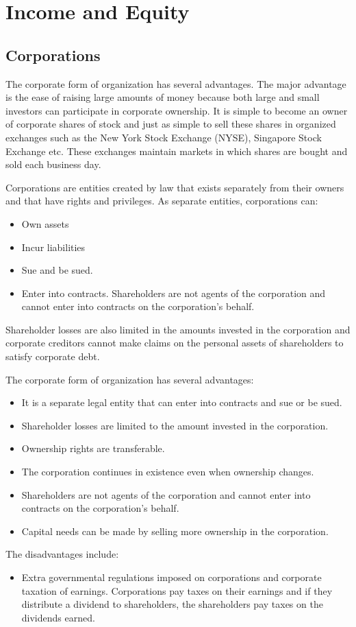 \documentclass[../main.tex]{subfiles}
\begin{document}
	\section{Income and Equity}
	
	\subsection{Corporations}
	
	The corporate form of organization has several advantages. The major 
	advantage is the ease of raising large amounts of money because both large 
	and small investors can participate in corporate ownership. It is simple to 
	become an owner of corporate shares of stock and just as simple to sell 
	these shares in organized exchanges such as the New York Stock Exchange 
	(NYSE), Singapore Stock Exchange etc. These exchanges maintain markets in 
	which shares are bought and sold each business day. 
	
	Corporations are entities created by law that exists separately from their 
	owners and that have rights and privileges. As separate entities, 
	corporations can:
	\begin{itemize}[noitemsep]
		\item Own assets
		\item Incur liabilities
		\item Sue and be sued.
		\item Enter into contracts. Shareholders are not agents of the 
		corporation and cannot enter into contracts on the corporation's 
		behalf. 
	\end{itemize}
	Shareholder losses are also limited in the amounts invested in the 
	corporation and corporate creditors cannot make claims on the personal 
	assets of shareholders to satisfy corporate debt.
	
	The corporate  form of organization has several advantages:
	\begin{itemize}[noitemsep]
		\item It is a separate legal entity that can enter into contracts and 
		sue or be sued. 
		\item Shareholder losses are limited to the amount invested in the 
		corporation.
		\item Ownership rights are transferable. 
		\item The corporation continues in existence even when ownership 
		changes. 
		\item Shareholders are not agents of the corporation and cannot enter 
		into contracts on the corporation's behalf. 
		\item Capital needs can be made by selling more ownership in the 
		corporation. 
	\end{itemize}
	The disadvantages include:
	\begin{itemize}[noitemsep]
		\item Extra governmental regulations imposed on corporations and 
		corporate taxation of earnings. Corporations pay taxes on their 
		earnings and if they distribute a dividend to shareholders, the 
		shareholders pay taxes on the dividends earned. 
	\end{itemize}
	
\end{document}
